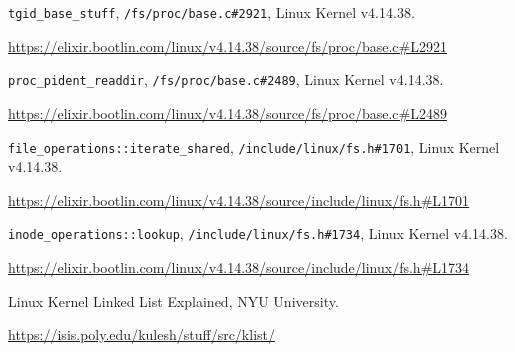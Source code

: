 \documentclass[a4paper,10pt]{article}
\begin{document}
  \begin{thebibliography}{9}

    \lstinline{tgid_base_stuff}, \lstinline{/fs/proc/base.c#2921}, Linux Kernel v4.14.38.

    \url{https://elixir.bootlin.com/linux/v4.14.38/source/fs/proc/base.c#L2921}

    \lstinline{proc_pident_readdir}, \lstinline{/fs/proc/base.c#2489}, Linux Kernel v4.14.38.

    \url{https://elixir.bootlin.com/linux/v4.14.38/source/fs/proc/base.c#L2489}

    \lstinline{file_operations::iterate_shared}, \lstinline{/include/linux/fs.h#1701}, Linux Kernel v4.14.38.

    \url{https://elixir.bootlin.com/linux/v4.14.38/source/include/linux/fs.h#L1701}

    \lstinline{inode_operations::lookup}, \lstinline{/include/linux/fs.h#1734}, Linux Kernel v4.14.38.

    \url{https://elixir.bootlin.com/linux/v4.14.38/source/include/linux/fs.h#L1734}

    Linux Kernel Linked List Explained, NYU University.

    \url{https://isis.poly.edu/kulesh/stuff/src/klist/}

  \end{thebibliography}
\end{document}
